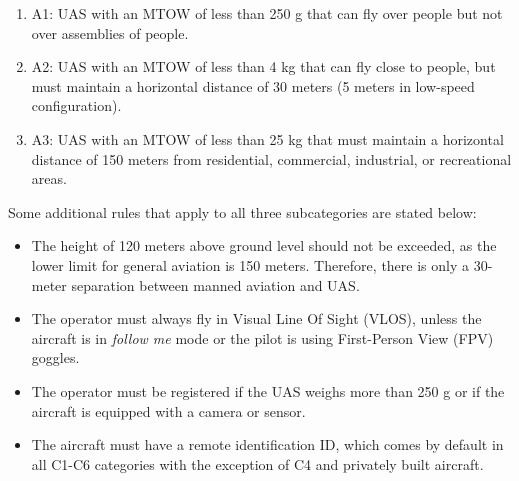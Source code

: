 \begin{enumerate}
  \item A1: UAS with an MTOW of less than 250 g that can fly over people but not over assemblies of people.

  \item A2: UAS with an MTOW of less than 4 kg that can fly close to people, but must maintain a horizontal distance of 30 meters (5 meters in low-speed configuration).

  \item A3: UAS with an MTOW of less than 25 kg that must maintain a horizontal distance of 150 meters from residential, commercial, industrial, or recreational areas.
\end{enumerate}


Some additional rules that apply to all three subcategories are stated below:

\begin{itemize}
  \item The height of 120 meters above ground level should not be exceeded, as the lower limit for general aviation is 150 meters. Therefore, there is only a 30-meter separation between manned aviation and UAS.

  \item The operator must always fly in Visual Line Of Sight (VLOS), unless the aircraft is in \textit{follow me} mode or the pilot is using First-Person View (FPV) goggles.

  \item The operator must be registered if the UAS weighs more than 250 g or if the aircraft is equipped with a camera or sensor.

  \item The aircraft must have a remote identification ID\autocite{eu-945-2019}, which comes by default in all C1-C6 categories with the exception of C4 and privately built aircraft.
\end{itemize}
